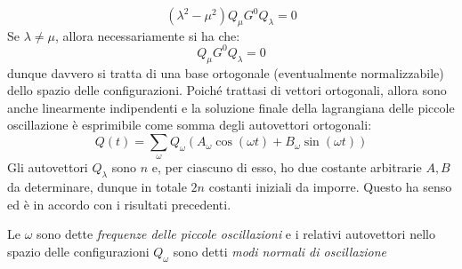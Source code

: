 \documentclass[a4paper,openany]{article}
\begin{document}
	$$
	(\lambda^2-\mu^2)Q_{\mu} G^0 Q_{\lambda} = 0
	$$
	Se $\lambda \neq \mu$, allora necessariamente si ha che:
	\begin{equation}\label{key}
		Q_{\mu} G^0 Q_{\lambda} = 0
	\end{equation}
	dunque davvero si tratta di una base ortogonale (eventualmente normalizzabile) dello spazio delle configurazioni. Poiché trattasi di vettori ortogonali, allora sono anche linearmente indipendenti e la soluzione finale della lagrangiana delle piccole oscillazione è esprimibile come somma degli autovettori ortogonali:
	\begin{equation}\label{key}
		Q(t) = \sum_{\omega}Q_{\omega}(A_{\omega}\cos(\omega t)+B_{\omega}\sin(\omega t))
	\end{equation}
	Gli autovettori $Q_{\lambda}$ sono $n$ e, per ciascuno di esso, ho due costante arbitrarie $A,B$ da determinare, dunque in totale $2n$ costanti iniziali da imporre. Questo ha senso ed è in accordo con i risultati precedenti.
	
	Le $\omega$ sono dette \textit{frequenze delle piccole oscillazioni} e i relativi autovettori nello spazio delle configurazioni $Q_{\omega}$ sono detti \textit{modi normali di oscillazione}
\end{document}
